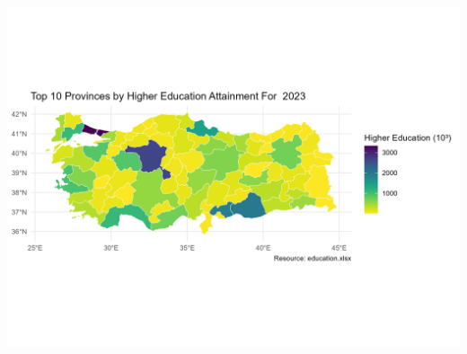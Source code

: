 \documentclass[
  11pt,
  a4paper,
  DIV=11,
  numbers=noendperiod]{scrartcl}
\begin{document}
\includegraphics[width=8in,height=\textheight,keepaspectratio]{higher_education_static.png}
\end{document}
